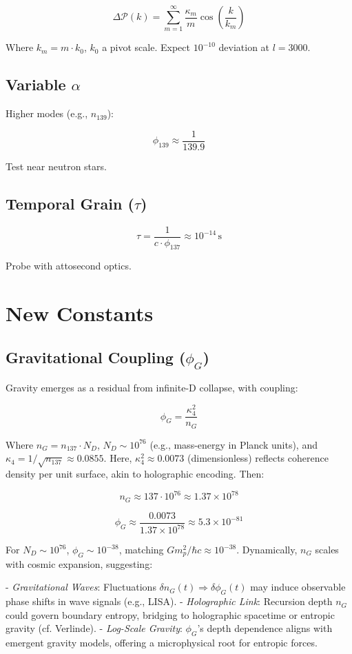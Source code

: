 \documentclass[12pt]{article}
\begin{document}
\[
\Delta \mathcal{P}(k) = \sum_{m=1}^\infty \frac{\kappa_m}{m} \cos\left(\frac{k}{k_m}\right)
\]

Where \(k_m = m \cdot k_0\), \(k_0\) a pivot scale. Expect \(10^{-10}\) deviation at \(l = 3000\).

\subsection{Variable \(\alpha\)}
Higher modes (e.g., \(n_{139}\)):

\[
\phi_{139} \approx \frac{1}{139.9}
\]

Test near neutron stars.

\subsection{Temporal Grain (\(\tau\))}
\[
\tau = \frac{1}{c \cdot \phi_{137}} \approx 10^{-14} \, \text{s}
\]

Probe with attosecond optics.

\section{New Constants}

\subsection{Gravitational Coupling (\(\phi_G\))}
Gravity emerges as a residual from infinite-D collapse, with coupling:

\[
\phi_G = \frac{\kappa_4^2}{n_G}
\]

Where \(n_G = n_{137} \cdot N_D\), \(N_D \sim 10^{76}\) (e.g., mass-energy in Planck units), and \(\kappa_4 = 1/\sqrt{n_{137}} \approx 0.0855\). Here, \(\kappa_4^2 \approx 0.0073\) (dimensionless) reflects coherence density per unit surface, akin to holographic encoding. Then:

\[
n_G \approx 137 \cdot 10^{76} \approx 1.37 \times 10^{78}
\]

\[
\phi_G \approx \frac{0.0073}{1.37 \times 10^{78}} \approx 5.3 \times 10^{-81}
\]

For \(N_D \sim 10^{76}\), \(\phi_G \sim 10^{-38}\), matching \(G m_p^2 / \hbar c \approx 10^{-38}\). Dynamically, \(n_G\) scales with cosmic expansion, suggesting:

- \textit{Gravitational Waves}: Fluctuations \(\delta n_G(t) \Rightarrow \delta \phi_G(t)\) may induce observable phase shifts in wave signals (e.g., LISA).
- \textit{Holographic Link}: Recursion depth \(n_G\) could govern boundary entropy, bridging to holographic spacetime or entropic gravity (cf. Verlinde).
- \textit{Log-Scale Gravity}: \(\phi_G\)'s depth dependence aligns with emergent gravity models, offering a microphysical root for entropic forces.
\end{document}
